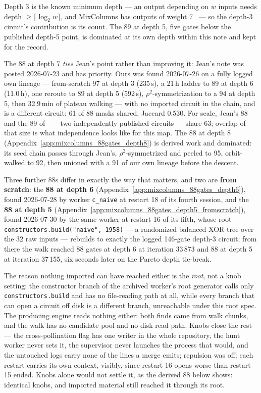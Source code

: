 \documentclass[11pt,a4paper]{article}
\begin{document}
Depth 3 is the known minimum depth --- an output depending on $w$ inputs needs
depth $\ge \lceil \log_2 w \rceil$, and MixColumns has outputs of weight
7~\cite{SFX23} --- so the depth-3 circuit's contribution is its count. The 89 at
depth 5, five gates below the published depth-5 point, is dominated at its own
depth within this note and kept for the record.

The 88 at depth 7 \emph{ties} Jean's point rather than improving it: Jean's note
was posted 2026-07-23 and has priority. Ours was found 2026-07-26 on a fully
logged own lineage --- from-scratch 97 at depth 3 (235\,s), a 21\,h ladder to 89
at depth 6 (11.0\,h), one reroute to 89 at depth 5 (592\,s),
$\rho^2$-symmetrization to a 94 at depth 5, then 32.9\,min of plateau walking
--- with no imported circuit in the chain, and is a different circuit: 61 of 88
masks shared, Jaccard 0.530. For scale, Jean's 88 and the 89 of~\cite{SYL25} ---
two independently published circuits --- share 63; overlap of that size is what
independence looks like for this map. The 88 at depth 8
(Appendix~\ref{app:mixcolumns_88gates_depth8}) is derived work and dominated:
its seed chain passes through Jean's, $\rho^2$-symmetrized and peeled to 95,
orbit-walked to 92, then unioned with a 91 of our own lineage before the
descent.

Three further 88s differ in exactly the way that matters, and two are
\textbf{from scratch}: the \textbf{88 at depth 6}
(Appendix~\ref{app:mixcolumns_88gates_depth6}), found 2026-07-28 by worker
\texttt{c\_naive} at restart 18 of its fourth session, and the \textbf{88 at
depth 5} (Appendix~\ref{app:mixcolumns_88gates_depth5_fromscratch}), found
2026-07-30 by the same worker at restart 16 of its fifth, whose root
\texttt{constructors.build("naive",\,1958)} --- a randomized balanced XOR tree
over the 32 raw inputs --- rebuilds to exactly the logged 146-gate depth-3
circuit; from there the walk reached 88 gates at depth 6 at iteration 33\,873
and 88 at depth 5 at iteration 37\,155, six seconds later on the Pareto depth
tie-break.

The reason nothing imported can have reached either is the \emph{root}, not a
knob setting: the constructor branch of the archived worker's root generator
calls only \texttt{constructors.build} and has no file-reading path at all,
while every branch that can open a circuit off disk is a different branch,
unreachable under this root spec. The producing engine reads nothing
either: both finds came from walk chunks, and the walk has no candidate pool and
no disk read path. Knobs close the rest --- the cross-pollination flag has one
writer in the whole repository, the hunt worker never sets it, the supervisor
never launches the process that would, and the untouched logs carry none of the
lines a merge emits; repulsion was off; each restart carries its own context,
visibly, since restart 16 opens worse than restart 15 ended. Knobs alone would
not settle it, as the derived 88 below shows: identical knobs, and imported
material still reached it through its root.
\end{document}
